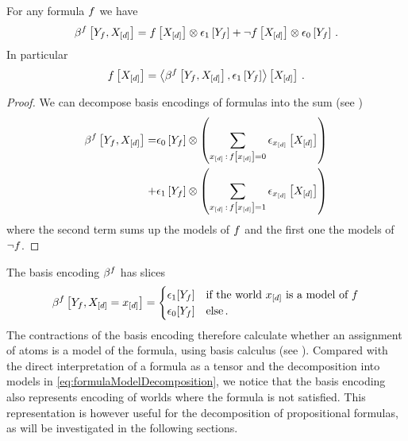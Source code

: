 \begin{lemma}
    \label{lem:formulaEncodingDecomposition}
    For any formula $f$ we have
    \begin{align*}
        \beta^{f}\left[Y_{f},X_{[d]}\right]
        = f\left[X_{[d]}\right] \otimes \epsilon_1\left[Y_{f}\right]
        + \lnot f\left[X_{[d]}\right] \otimes  \epsilon_0\left[Y_{f}\right] \, .
    \end{align*}
    In particular
    \begin{align*}
        f\left[X_{[d]}\right] = \left\langle 
            \beta^{f}\left[Y_{f},X_{[d]}\right],\epsilon_1\left[Y_{f}\right]
        \right\rangle \left[ X_{[d]} \right] \, .
    \end{align*}
\end{lemma}
\begin{proof}
    We can decompose basis encodings of formulas into the sum (see ) %
    \begin{align}
        \beta^{f}\left[Y_{f},X_{[d]}\right]
        = & \epsilon_0\left[Y_{f}\right] \otimes \left( \sum_{x_{[d]}\,:\,f\left[x_{[d]}\right]=0}  \epsilon_{x_{[d]}}\left[X_{[d]}\right] \right) \\
        + & \epsilon_1\left[Y_{f}\right] \otimes \left( \sum_{x_{[d]}\,:\,f\left[x_{[d]}\right]=1}  \epsilon_{x_{[d]}}\left[X_{[d]}\right] \right)
    \end{align}
    where the second term sums up the models of $f$ and the first one the models of $\lnot f$.
\end{proof}

The basis encoding $\beta^{f}$ has slices
\begin{align*}
    \beta^{f}\left[Y_{f},X_{[d]}=x_{[d]}\right]
    = \begin{cases}
          \epsilon_1[Y_{f}] & \text{if the world $x_{[d]}$ is a model of $f$}  \\
          \epsilon_0[Y_{f}] & \text{else}\, .
    \end{cases}
\end{align*}
The contractions of the basis encoding therefore calculate whether an assignment of atoms is a model of the formula, using basis calculus (see ).
Compared with the direct interpretation of a formula as a tensor and the decomposition into models in \eqref{eq:formulaModelDecomposition}, we notice that the basis encoding also represents encoding of worlds where the formula is not satisfied.
This representation is however useful for the decomposition of propositional formulas, as will be investigated in the following sections.


